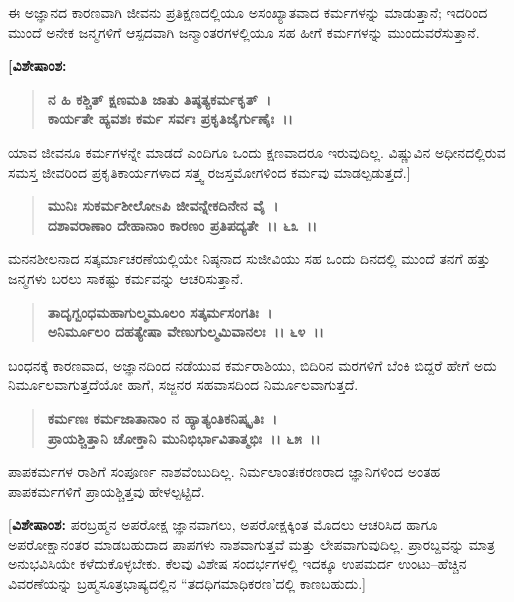 ಈ ಅಜ್ಞಾನದ ಕಾರಣವಾಗಿ ಜೀವನು ಪ್ರತಿಕ್ಷಣದಲ್ಲಿಯೂ ಅಸಂಖ್ಯಾತವಾದ ಕರ್ಮಗಳನ್ನು ಮಾಡುತ್ತಾನೆ; ಇದರಿಂದ ಮುಂದೆ ಅನೇಕ ಜನ್ಮಗಳಿಗೆ ಆಸ್ಪದವಾಗಿ ಜನ್ಮಾಂತರಗಳಲ್ಲಿಯೂ ಸಹ ಹೀಗೆ ಕರ್ಮಗಳನ್ನು ಮುಂದುವರೆಸುತ್ತಾನೆ.

\begin{flushleft}
\textbf{[ವಿಶೇಷಾಂಶ:}
\end{flushleft}

\begin{verse}
\textbf{ನ ಹಿ ಕಶ್ಚಿತ್ ಕ್ಷಣಮತಿ ಜಾತು ತಿಷ್ಠತ್ಯಕರ್ಮಕೃತ್~।}\\\textbf{ಕಾರ್ಯತೇ ಹ್ಯವಶಃ ಕರ್ಮ ಸರ್ವಃ ಪ್ರಕೃತಿಜೈರ್ಗುಣೈಃ~।।}  
\end{verse}

ಯಾವ ಜೀವನೂ ಕರ್ಮಗಳನ್ನೇ ಮಾಡದೆ ಎಂದಿಗೂ ಒಂದು ಕ್ಷಣವಾದರೂ ಇರುವುದಿಲ್ಲ. ವಿಷ್ಣುವಿನ ಅಧೀನದಲ್ಲಿರುವ ಸಮಸ್ತ ಜೀವರಿಂದ ಪ್ರಕೃತಿಕಾರ್ಯಗಳಾದ ಸತ್ತ್ವ ರಜಸ್ತಮೋಗಳಿಂದ ಕರ್ಮವು ಮಾಡಲ್ಪಡುತ್ತದೆ.]

\begin{verse}
\textbf{ಮುನಿಃ ಸುಕರ್ಮಶೀಲೋsಪಿ ಜೀವನ್ನೇಕದಿನೇನ ವೈ~।}\\\textbf{ದಶಾವರಾಣಾಂ ದೇಹಾನಾಂ ಕಾರಣಂ ಪ್ರತಿಪದ್ಯತೇ~।। ೬೩~।।}
\end{verse}

ಮನನಶೀಲನಾದ ಸತ್ಕರ್ಮಾಚರಣೆಯಲ್ಲಿಯೇ ನಿಷ್ಠನಾದ ಸುಜೀವಿಯು ಸಹ ಒಂದು ದಿನದಲ್ಲಿ ಮುಂದೆ ತನಗೆ ಹತ್ತು ಜನ್ಮಗಳು ಬರಲು ಸಾಕಷ್ಟು ಕರ್ಮವನ್ನು ಆಚರಿಸುತ್ತಾನೆ.

\begin{verse}
\textbf{ತಾದೃಗ್ಬಂಧಮಹಾಗುಲ್ಮಮೂಲಂ ಸತ್ಕರ್ಮಸಂಗತಿಃ~।}\\\textbf{ಅನಿರ್ಮೂಲಂ ದಹತ್ಯೇಷಾ ವೇಣುಗುಲ್ಮಮಿವಾನಲಃ~।। ೬೪~।।}
\end{verse}

ಬಂಧನಕ್ಕೆ ಕಾರಣವಾದ, ಅಜ್ಞಾನದಿಂದ ನಡೆಯುವ ಕರ್ಮರಾಶಿಯು, ಬಿದಿರಿನ ಮರಗಳಿಗೆ ಬೆಂಕಿ ಬಿದ್ದರೆ ಹೇಗೆ ಅದು ನಿರ್ಮೂಲವಾಗುತ್ತದೆಯೋ ಹಾಗೆ, ಸಜ್ಜನರ ಸಹವಾಸದಿಂದ ನಿರ್ಮೂಲವಾಗುತ್ತದೆ.

\begin{verse}
\textbf{ಕರ್ಮಣಃ ಕರ್ಮಜಾತಾನಾಂ ನ ಹ್ಯಾತ್ಯಂತಿಕನಿಷ್ಕೃತಿಃ~।}\\\textbf{ಪ್ರಾಯಶ್ಚಿತ್ತಾನಿ ಚೋಕ್ತಾನಿ ಮುನಿಭಿರ್ಭಾವಿತಾತ್ಮಭಿಃ~।। ೬೫~।।}
\end{verse}

ಪಾಪಕರ್ಮಗಳ ರಾಶಿಗೆ ಸಂಪೂರ್ಣ ನಾಶವೆಂಬುದಿಲ್ಲ. ನಿರ್ಮಲಾಂತಃಕರಣರಾದ ಜ್ಞಾನಿಗಳಿಂದ ಅಂತಹ ಪಾಪಕರ್ಮಗಳಿಗೆ ಪ್ರಾಯಶ್ಚಿತ್ತವು ಹೇಳಲ್ಪಟ್ಟಿದೆ.

[\textbf{ವಿಶೇಷಾಂಶ:} ಪರಬ್ರಹ್ಮನ ಅಪರೋಕ್ಷ ಜ್ಞಾನವಾಗಲು, ಅಪರೋಕ್ಷಕ್ಕಿಂತ ಮೊದಲು ಆಚರಿಸಿದ ಹಾಗೂ ಅಪರೋಕ್ಷಾನಂತರ ಮಾಡಬಹುದಾದ ಪಾಪಗಳು ನಾಶವಾಗುತ್ತವೆ ಮತ್ತು ಲೇಪವಾಗುವುದಿಲ್ಲ. ಪ್ರಾರಬ್ದವನ್ನು ಮಾತ್ರ ಅನುಭವಿಸಿಯೇ ಕಳೆದುಕೊಳ್ಳಬೇಕು. ಕೆಲವು ವಿಶೇಷ ಸಂದರ್ಭಗಳಲ್ಲಿ ಇದಕ್ಕೂ ಉಪಮರ್ದ ಉಂಟು–ಹೆಚ್ಚಿನ ವಿವರಣೆಯನ್ನು ಬ್ರಹ್ಮಸೂತ್ರಭಾಷ್ಯದಲ್ಲಿನ “ತದಧಿಗಮಾಧಿಕರಣ'ದಲ್ಲಿ ಕಾಣಬಹುದು.]

